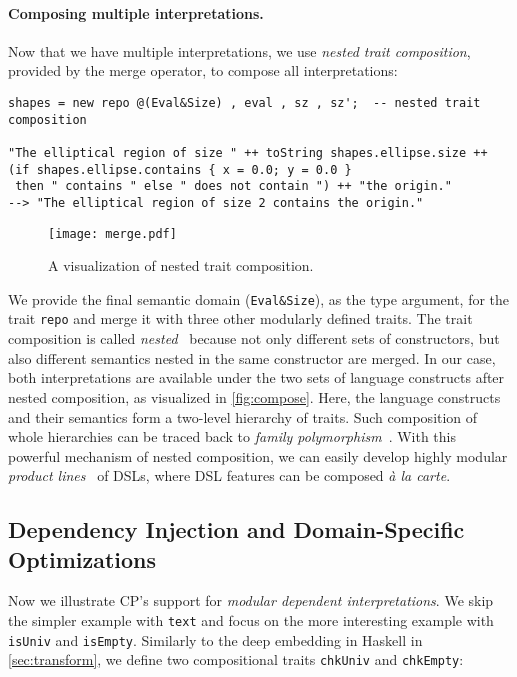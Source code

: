 \paragraph{Composing multiple interpretations.}
Now that we have multiple interpretations, we use \emph{nested trait composition},
provided by the merge operator, to compose all interpretations:

\begin{lstlisting}
shapes = new repo @(Eval&Size) , eval , sz , sz';  -- nested trait composition

"The elliptical region of size " ++ toString shapes.ellipse.size ++
(if shapes.ellipse.contains { x = 0.0; y = 0.0 }
 then " contains " else " does not contain ") ++ "the origin."
--> "The elliptical region of size 2 contains the origin."
\end{lstlisting}

\begin{figure}[b]
  \texttt{[image: merge.pdf]}
  \caption{A visualization of nested trait composition.} \label{fig:compose}
\end{figure}

\noindent
We provide the final semantic domain (\lstinline{Eval&Size}), as the type
argument, for the trait \lstinline{repo} and merge it with three other modularly
defined traits. The trait composition is called
\emph{nested}~\citep{bi2018essence} because not only different sets of
constructors, but also different semantics nested in the same constructor are
merged. In our case, both interpretations are available under the two sets of
language constructs after nested composition, as visualized in
\autoref{fig:compose}. Here, the language constructs and their semantics form a
two-level hierarchy of traits. Such composition of whole hierarchies can be
traced back to \emph{family polymorphism}~\citep{ernst2001family}. With this
powerful mechanism of nested composition, we can easily develop highly modular
\emph{product lines}~\citep{apel2013feature} of DSLs, where DSL features can be
composed \emph{à la carte}.

\subsection{Dependency Injection and Domain-Specific Optimizations} \label{sec:deps}

Now we illustrate CP's support for \emph{modular dependent interpretations}. We
skip the simpler example with \lstinline{text} and focus on the more interesting
example with \lstinline{isUniv} and \lstinline{isEmpty}. Similarly to the deep
embedding in Haskell in \autoref{sec:transform}, we define two compositional
traits \lstinline{chkUniv} and \lstinline{chkEmpty}:

